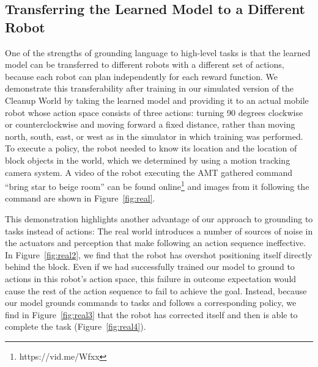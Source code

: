 \documentclass[conference]{IEEEtran}
\begin{document}
\subsection{Transferring the Learned Model to a Different Robot}
One of the strengths of grounding language to high-level tasks is that the learned model can be transferred to different robots with a different set of actions, because each robot can plan independently for each reward function. We demonstrate this transferability after training in our simulated version of the Cleanup World by taking the learned model and providing it to an actual mobile robot whose action space consists of three actions: turning 90 degrees clockwise or counterclockwise and moving forward a fixed distance, rather than moving north, south, east, or west as in the simulator in which training was performed. To execute a policy, the robot needed to know its location and the location of block objects in the world, which we determined by using a motion tracking camera system. A video of the robot executing the AMT gathered command ``bring star to beige room'' can be found online\footnote{https://vid.me/Wfxx} and images from it following the command are shown in Figure~\ref{fig:real}.

This demonstration highlights another advantage of our approach to grounding to tasks instead of actions: The real world introduces a number of sources of noise in the actuators and perception that make following an action sequence ineffective. In Figure~\ref{fig:real2}, we find that the robot has overshot positioning itself directly behind the block. Even if we had successfully trained our model to ground to actions in this robot's action space, this failure in outcome expectation would cause the rest of the action sequence to fail to achieve the goal. Instead, because our model grounds commands to tasks and follows a corresponding policy, we find in Figure~\ref{fig:real3} that the robot has corrected itself and then is able to complete the task (Figure~\ref{fig:real4}).
\end{document}
